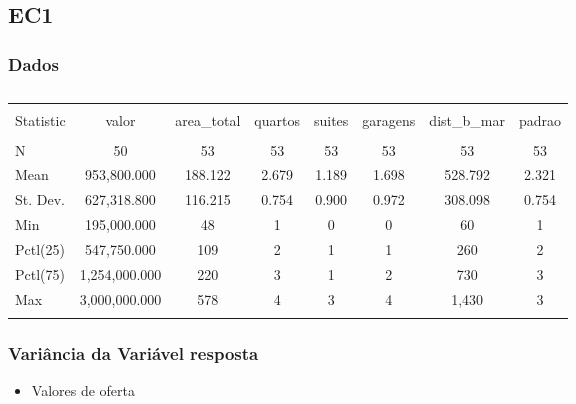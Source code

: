 \documentclass{article}
\newenvironment{Shaded}{\begin{snugshade}}{\end{snugshade}}
\newcommand{\DataTypeTok}[1]{\textcolor[rgb]{0.13,0.29,0.53}{#1}}
\newcommand{\KeywordTok}[1]{\textcolor[rgb]{0.13,0.29,0.53}{\textbf{#1}}}
\newcommand{\NormalTok}[1]{#1}
\newcommand{\OperatorTok}[1]{\textcolor[rgb]{0.81,0.36,0.00}{\textbf{#1}}}
\newcommand{\OtherTok}[1]{\textcolor[rgb]{0.56,0.35,0.01}{#1}}
\begin{document}
\hypertarget{ec1}{%
\subsection{EC1}\label{ec1}}

\hypertarget{dados}{%
\subsubsection{Dados}\label{dados}}

\begin{table}[!htbp] \centering 
  \caption{} 
  \label{} 
\begin{tabular}{@{\extracolsep{5pt}}lccccccc} 
\\[-1.8ex]\hline 
\hline \\[-1.8ex] 
Statistic & valor & area\_total & quartos & suites & garagens & dist\_b\_mar & padrao \\ 
\hline \\[-1.8ex] 
N & 50 & 53 & 53 & 53 & 53 & 53 & 53 \\ 
Mean & 953,800.000 & 188.122 & 2.679 & 1.189 & 1.698 & 528.792 & 2.321 \\ 
St. Dev. & 627,318.800 & 116.215 & 0.754 & 0.900 & 0.972 & 308.098 & 0.754 \\ 
Min & 195,000.000 & 48 & 1 & 0 & 0 & 60 & 1 \\ 
Pctl(25) & 547,750.000 & 109 & 2 & 1 & 1 & 260 & 2 \\ 
Pctl(75) & 1,254,000.000 & 220 & 3 & 1 & 2 & 730 & 3 \\ 
Max & 3,000,000.000 & 578 & 4 & 3 & 4 & 1,430 & 3 \\ 
\hline \\[-1.8ex] 
\end{tabular} 
\end{table}

\hypertarget{variuxe2ncia-da-variuxe1vel-resposta}{%
\subsubsection{Variância da Variável
resposta}\label{variuxe2ncia-da-variuxe1vel-resposta}}

\begin{itemize}
\tightlist
\item
  Valores de oferta
\end{itemize}

\begin{Shaded}
\end{Shaded}
\end{document}
